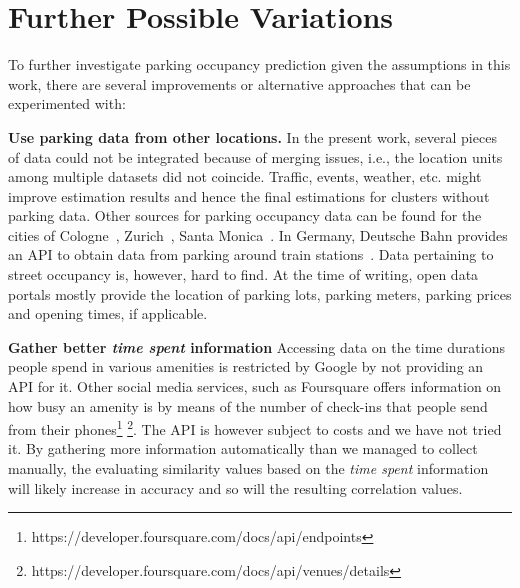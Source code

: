 	\section{Further Possible Variations}
	To further investigate parking occupancy prediction given the assumptions in this work, there are several improvements or alternative approaches that can be experimented with:
	
	\begin{romanlist}
		\item \textbf{Use parking data from other locations.}
		In the present work, several pieces of data could not be integrated because of merging issues, i.e., the location units among multiple datasets did not coincide.
		Traffic, events, weather, etc. might improve estimation results and hence the final estimations for clusters without parking data.
		Other sources for parking occupancy data can be found for the cities of Cologne~\cite{cologne_data}, Zurich~\cite{zurich_data}, Santa Monica~\cite{santa_monica_data}.
		In Germany, Deutsche Bahn provides an API to obtain data from parking around train stations~\cite{dbbahn_data}.
		Data pertaining to street occupancy is, however, hard to find.
		At the time of writing, open data portals mostly provide the location of parking lots, parking meters, parking prices and opening times, if applicable.  
		
		\item \textbf{Gather better \textit{time spent} information}
		Accessing data on the time durations people spend in various amenities is restricted by Google by not providing an API for it. Other social media services, such as Foursquare offers information on how busy an amenity is by means of the number of check-ins that people send from their phones\footnote{https://developer.foursquare.com/docs/api/endpoints}  \footnote{https://developer.foursquare.com/docs/api/venues/details}. The API is however subject to costs and we have not tried it. By gathering more information automatically than we managed to collect manually, the evaluating similarity values based on the \textit{time spent} information will likely increase in accuracy and so will the resulting correlation values.  
		

\end{romanlist}
